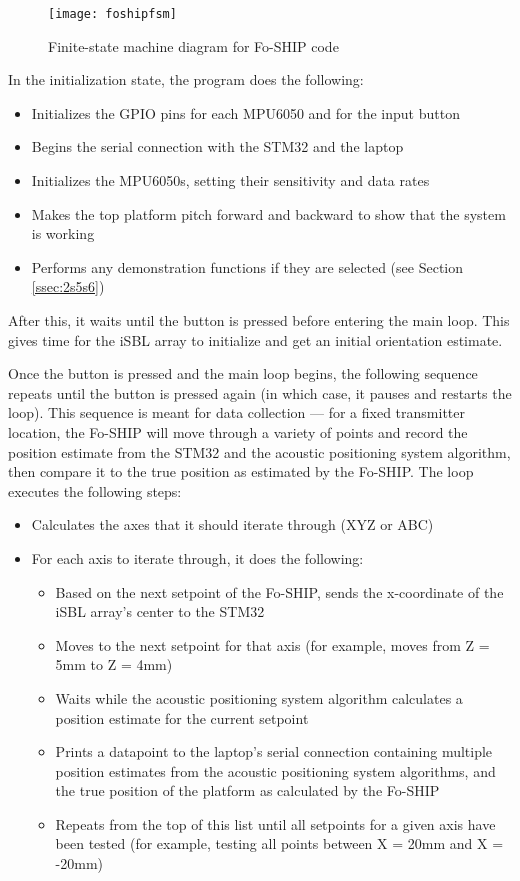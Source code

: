 \documentclass[11pt]{ucthesisCP}
\begin{document}
\begin{figure}[htbp]
	\centering
	\texttt{[image: foshipfsm]}
	\caption{Finite-state machine diagram for Fo-SHIP code}
	\label{fig:foshipfsm}
\end{figure}

\noindent In the initialization state, the program does the following:

\begin{itemize}[noitemsep,topsep=0pt]
	\item Initializes the GPIO pins for each MPU6050 and for the input button
	\item Begins the serial connection with the STM32 and the laptop
	\item Initializes the MPU6050s, setting their sensitivity and data rates
	\item Makes the top platform pitch forward and backward to show that the system is working
	\item Performs any demonstration functions if they are selected (see Section \ref{ssec:2s5s6})
\end{itemize}

After this, it waits until the button is pressed before entering the main loop. This gives time for the iSBL array to initialize and get an initial orientation estimate.

Once the button is pressed and the main loop begins, the following sequence repeats until the button is pressed again (in which case, it pauses and restarts the loop). This sequence is meant for data collection --- for a fixed transmitter location, the Fo-SHIP will move through a variety of points and record the position estimate from the STM32 and the acoustic positioning system algorithm, then compare it to the true position as estimated by the Fo-SHIP. The loop executes the following steps:

\begin{itemize}[noitemsep,topsep=0pt]
	\item Calculates the axes that it should iterate through (XYZ or ABC)
	\item For each axis to iterate through, it does the following:
	
	\begin{itemize}[noitemsep,topsep=3ex]
		\item Based on the next setpoint of the Fo-SHIP, sends the x-coordinate of the iSBL array's center to the STM32
		\item Moves to the next setpoint for that axis (for example, moves from Z = 5mm to Z = 4mm)
		\item Waits while the acoustic positioning system algorithm calculates a position estimate for the current setpoint
		\item Prints a datapoint to the laptop's serial connection containing multiple position estimates from the acoustic positioning system algorithms, and the true position of the platform as calculated by the Fo-SHIP
		\item Repeats from the top of this list until all setpoints for a given axis have been tested (for example, testing all points between X = 20mm and X = -20mm)
	\end{itemize}
\end{itemize}
\end{document}
